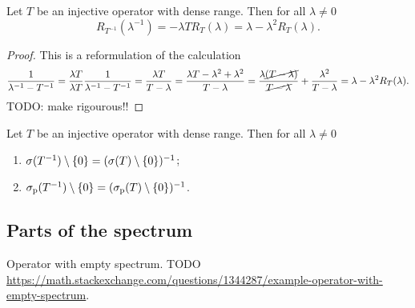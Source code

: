 \begin{proposition}
Let $T$ be an injective operator with dense range. Then for all $\lambda\neq 0$
\[ R_{T^{-1}}(\lambda^{-1}) = -\lambda T R_{T}(\lambda) = \lambda -\lambda^2 R_T(\lambda). \]
\end{proposition}
\begin{proof}
This is a reformulation of the calculation
\[ \frac{1}{\lambda^{-1} - T^{-1}} = \frac{\lambda T}{\lambda T}\frac{1}{\lambda^{-1} - T^{-1}} = \frac{\lambda T}{T - \lambda} = \frac{\lambda T - \lambda^2 + \lambda^2}{T - \lambda} = \frac{\lambda\cancel{(T - \lambda)}}{\cancel{T - \lambda}} + \frac{\lambda^2}{T - \lambda} = \lambda - \lambda^2 R_T(\lambda). \]
TODO: make rigourous!!
\end{proof}
\begin{corollary}
Let $T$ be an injective operator with dense range. Then for all $\lambda\neq 0$
\begin{enumerate}
\item $\sigma(T^{-1})\setminus\{0\} = (\sigma(T)\setminus \{0\})^{-1}$;
\item $\sigma_\text{p}(T^{-1})\setminus\{0\} = (\sigma_\text{p}(T)\setminus \{0\})^{-1}$.
\end{enumerate}
\end{corollary}


\subsection{Parts of the spectrum}

\begin{example}
Operator with empty spectrum. TODO \url{https://math.stackexchange.com/questions/1344287/example-operator-with-empty-spectrum}.
\end{example}


